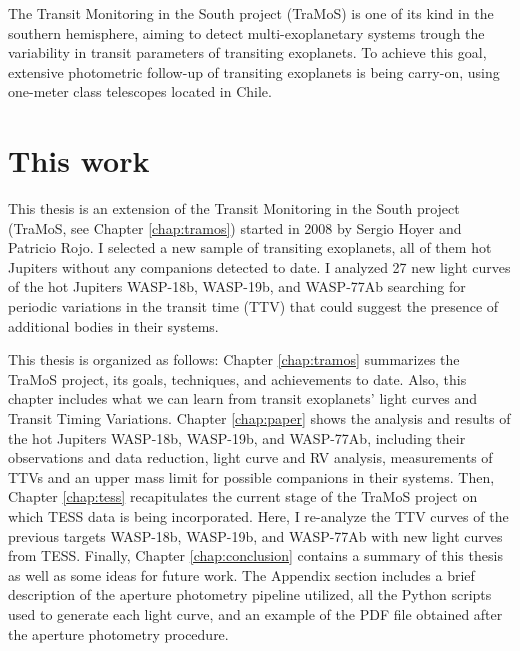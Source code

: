 The Transit Monitoring in the South project (TraMoS) is one of its kind in the southern hemisphere, aiming to detect multi-exoplanetary systems trough the variability in transit parameters of transiting exoplanets. To achieve this goal, extensive photometric follow-up of transiting exoplanets is being carry-on, using one-meter class telescopes located in Chile.



\section{This work}

This thesis is an extension of the Transit Monitoring in the South project (TraMoS, see Chapter \ref{chap:tramos}) started in 2008 by Sergio Hoyer and Patricio Rojo. I selected a new sample of transiting exoplanets, all of them hot Jupiters without any companions detected to date. I analyzed 27 new light curves of the hot Jupiters WASP-18b, WASP-19b, and WASP-77Ab searching for periodic variations in the transit time (TTV) that could suggest the presence of additional bodies in their systems. 

This thesis is organized as follows: Chapter \ref{chap:tramos} summarizes the TraMoS project, its goals, techniques, and achievements to date. Also, this chapter includes what we can learn from transit exoplanets' light curves and Transit Timing Variations. Chapter \ref{chap:paper} shows the analysis and results of the hot Jupiters WASP-18b, WASP-19b, and WASP-77Ab, including their observations and data reduction, light curve and RV analysis, measurements of TTVs and an upper mass limit for possible companions in their systems. Then, Chapter \ref{chap:tess}  recapitulates the current stage of the TraMoS project on which TESS data is being incorporated. Here, I re-analyze the TTV curves of the previous targets WASP-18b, WASP-19b, and WASP-77Ab with new light curves from TESS. Finally, Chapter \ref{chap:conclusion} contains a summary of this thesis as well as some ideas for future work. The Appendix section includes a brief description of the aperture photometry pipeline utilized, all the Python scripts used to generate each light curve, and an example of the PDF file obtained after the aperture photometry procedure.

